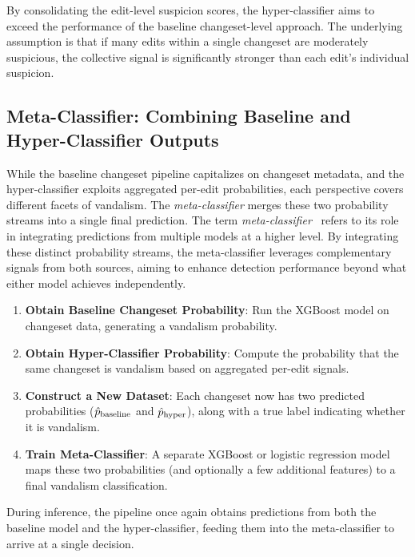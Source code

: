 \documentclass[
    13pt, %
    a4paper, %
    listof=totoc, %
    bibliography=totoc, %
    index=totoc, %
    headsepline
]{scrreprt}
\begin{document}
\noindent
By consolidating the edit-level suspicion scores, the hyper-classifier aims to exceed the performance of the baseline changeset-level approach. The underlying assumption is that if many edits within a single changeset are moderately suspicious, the collective signal is significantly stronger than each edit’s individual suspicion.

\subsection{Meta-Classifier: Combining Baseline and Hyper-Classifier Outputs}
\label{subsec:meta_classifier}

While the baseline changeset pipeline capitalizes on changeset metadata, and the hyper-classifier exploits aggregated per-edit probabilities, each perspective covers different facets of vandalism. The \emph{meta-classifier} merges these two probability streams into a single final prediction. The term \emph{meta-classifier}~\cite{meta_classifier_envisioning} refers to its role in integrating predictions from multiple models at a higher level. By integrating these distinct probability streams, the meta-classifier leverages complementary signals from both sources, aiming to enhance detection performance beyond what either model achieves independently.


\begin{enumerate}
    \item \textbf{Obtain Baseline Changeset Probability}: Run the XGBoost model on changeset data, generating a vandalism probability.
    \item \textbf{Obtain Hyper-Classifier Probability}: Compute the probability that the same changeset is vandalism based on aggregated per-edit signals.
    \item \textbf{Construct a New Dataset}: Each changeset now has two predicted probabilities (\(\hat{p}_{\textnormal{baseline}}\) and \(\hat{p}_{\textnormal{hyper}}\)), along with a true label indicating whether it is vandalism.
    \item \textbf{Train Meta-Classifier}: A separate XGBoost or logistic regression model maps these two probabilities (and optionally a few additional features) to a final vandalism classification.
\end{enumerate}

\noindent
During inference, the pipeline once again obtains predictions from both the baseline model and the hyper-classifier, feeding them into the meta-classifier to arrive at a single decision.  
\end{document}
